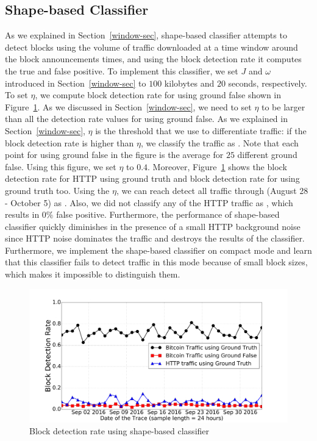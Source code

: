 \subsection{Shape-based Classifier}
As we explained in Section~\ref{window-sec}, shape-based classifier attempts to detect \bc blocks using the volume of traffic downloaded at a time window around the block announcements times, and using the block detection rate it computes the true and false positive.
To implement this classifier, we set $J$ and $\omega$ introduced in Section~\ref{window-sec} to $100$ kilobytes and $20$ seconds, respectively. 
To set $\eta$, we compute block detection rate for \bc using ground false shown in Figure~\ref{fig:window}. As we discussed in Section~\ref{window-sec}, we need to set $\eta$ to be larger than all the detection rate values for \bc using ground false. 
As we explained in Section~\ref{window-sec}, $\eta$ is the threshold that we use to differentiate \bc traffic: if the block detection rate is higher than $\eta$, we classify the traffic as \bc. Note that each point for \bc using ground false in the figure is the average for $25$ different ground false. Using this figure, we set $\eta$ to $0.4$. Moreover, Figure~\ref{fig:window} shows the block detection rate for HTTP using ground truth and block detection rate for \bc using ground truth too. Using the $\eta$, we can reach detect all \bc traffic through (August 28 - October 5) as \bc. Also, we did not classify any of the HTTP traffic as \bc, which results in $0\%$ false positive. Furthermore, the performance of shape-based classifier quickly diminishes in the presence of a small HTTP background noise since HTTP noise dominates the \bc traffic and destroys the results of the classifier. Furthermore, we implement the shape-based classifier on \bc compact mode and learn that this classifier fails to detect \bc traffic in this mode because of small block sizes, which makes it impossible to distinguish them.



\begin{figure}
\centering
\includegraphics[scale=0.15]{image/jan25/window.pdf}%
\caption{Block detection rate using shape-based classifier}
\label{fig:window}
\end{figure}
